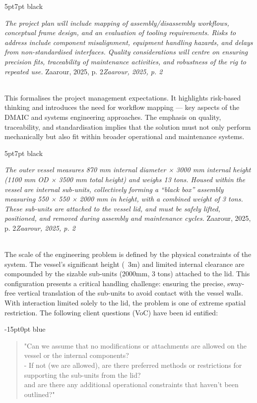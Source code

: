 \documentclass[9pt]{extarticle}
\newcommand{\formalsource}{}
\newenvironment{formal}[3][]{	\renewcommand{\formalsource}{#1}
	\def\lefty{\color{#2}\textquotedblleft}
	\def\righty{\color{#2}\textquotedblright}
	\def\FrameCommand{%
		\hspace{1pt}%
		{\color{#2}\vrule width 2pt}%
		{\color{#3}\vrule width 4pt}%
		\colorbox{#3}%
	}%
	\MakeFramed{\advance\hsize-\width\FrameRestore}%
	\begin{adjustwidth}{5pt}{7pt}%
		\ifx#2\empty\else\smash{\raisebox{-0.5em}{\Huge\lefty}}\hspace{0em}\fi%
	}{%
		\hspace{0em}\smash{\raisebox{-0.5em}{\Huge\righty}}\hfill%
		\ifx\formalsource\empty\else\hfill{\footnotesize\textit{\formalsource}}\fi%
	\end{adjustwidth}%
	\endMakeFramed%
	\noindent%
	\\
}
\newenvironment{formalt}[3][]{	
	\renewcommand{\formalsource}{#1}
	\def\lefty{\color{#2}\textquotedblleft}
	\def\righty{\color{#2}\textquotedblright}
	
	\def\FrameCommand{%
		\hspace{1pt}%
		{\color{#2}\vrule width 2pt}%
		{\color{#3}\vrule width 4pt}%
		\colorbox{#3}%
	}%
	
	\MakeFramed{\advance\hsize-\width\FrameRestore}%
\begin{adjustwidth}{-15pt}{0pt}%
	\ifx#2
	\empty
	\else
}{%
	\fi%
\end{adjustwidth}%
\vspace{0.5em}
\endMakeFramed%
	\noindent%
\\
}
\begin{document}
\begin{formal}[Zaarour, 2025, p. 2]{black}{white}
\textit{	The project plan will include mapping of assembly/disassembly workflows, conceptual frame design, and an evaluation of tooling requirements. Risks to address include component misalignment, equipment handling hazards, and delays from non-standardised interfaces. Quality considerations will centre on ensuring precision fits, traceability of maintenance activities, and robustness of the rig to repeated use.}
\end{formal}
This formalises the project management expectations. It highlights risk-based thinking and introduces the need for workflow mapping — key aspects of the DMAIC and systems engineering approaches. The emphasis on quality, traceability, and standardisation implies that the solution must not only perform mechanically but also fit within broader operational and maintenance systems.\\[1em]
\begin{formal}[Zaarour, 2025, p. 2]{black}{white}
\textit{	The outer vessel measures 870 mm internal diameter × 3000 mm internal height (1100 mm OD × 3500 mm total height) and weighs 13 tons. Housed within the vessel are internal sub-units, collectively forming a “black box” assembly measuring 550 × 550 × 2000 mm in height, with a combined weight of 3 tons. These sub-units are attached to the vessel lid, and must be safely lifted, positioned, and removed during assembly and maintenance cycles.}
\end{formal}
The scale of the engineering problem is defined by the physical constraints of the system. The vessel's significant height (~3m) and limited internal clearance are compounded by the sizable sub-units (2000mm, 3 tons) attached to the lid. This configuration presents a critical handling challenge: ensuring the precise, sway-free vertical translation of the sub-units to avoid contact with the vessel walls. With interaction limited solely to the lid, the problem is one of extreme spatial restriction. The following client questions (VoC) have been id	entified:
\begin{formalt}[]{blue}{blue!5!white}
\begin{quote}
	"Can we assume that no modifications or attachments are allowed on the vessel or the internal components?\\[0.2em]
	\small\hspace{4em}- If not (we are allowed), are there preferred methods or restrictions for supporting the sub-units from the lid?\\ \normalsize and are there any additional operational constraints that haven't been outlined?"
\end{quote}
\end{formalt}
	
\end{document}
